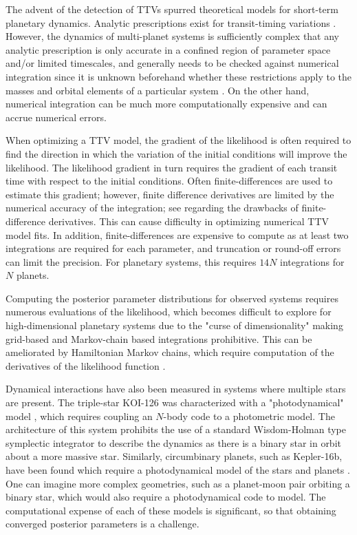 \documentclass[fleqn,usenatbib,twocolumn]{mnras}
\newcommand   {\change}[1] {{\color{black}{#1}}}
\begin{document}
The advent of the detection of TTVs spurred theoretical models for
short-term planetary dynamics. Analytic prescriptions exist for transit-timing
variations \citep[e.g.][]{Agol2005,Nesvorn2010,Lithwick2012,Nesvorn2014,
Deck2015,Agol2016,Deck2016,Nesvorn2016,Hadden2016}.
However, the dynamics of multi-planet
systems is sufficiently complex that any analytic prescription is only
accurate in a confined region of parameter space and/or limited timescales, and generally needs
to be checked against numerical integration since it is unknown beforehand
whether these restrictions apply to the masses and orbital
elements of a particular system \citep[e.g.][]{Deck2015,JontofHutter2016,
Hadden2017,Linial2018,Yoffe2021}.  On the other hand, numerical integration
can be much more computationally expensive and can accrue numerical errors.

When optimizing a TTV model, the gradient of the likelihood is often
required to find the direction in which the variation of the initial conditions
will improve the likelihood.  The likelihood gradient in turn
requires the gradient of each transit time with respect to the initial
conditions.  Often finite-differences are used to estimate this gradient;
however, finite difference derivatives are limited by the numerical
accuracy of the integration; see \citet{Rein2016} regarding the drawbacks of finite-difference derivatives.  This can cause
difficulty in optimizing numerical TTV model fits.   In addition, finite-differences are expensive to compute as at least
two integrations are required for each parameter, and truncation or round-off errors can limit the precision.  For planetary systems, this requires $14N$ integrations for $N$ planets.

Computing the posterior
parameter distributions for observed systems requires numerous evaluations
of the likelihood, which becomes difficult to explore for high-dimensional
planetary systems due to the "curse of dimensionality" making grid-based
and Markov-chain based integrations prohibitive.  This can be ameliorated
by Hamiltonian Markov chains, which require computation of the derivatives
of the likelihood function \citep{Girolami2011}.

Dynamical interactions have also been measured in systems where
multiple stars are present.  The triple-star KOI-126 was characterized
with a "photodynamical" model \citep{Carter2011}, which requires coupling
an $N$-body code to a photometric model.  The architecture of this system
prohibits the use of a standard Wisdom-Holman type symplectic integrator to describe the
dynamics as there is a binary star in orbit about a more massive star.
Similarly, circumbinary planets, such as Kepler-16b, have been
found which require a photodynamical model of the stars and planets
\citep{Doyle2011}.  One can imagine more complex geometries, such as
a planet-moon pair orbiting a binary star, which would also require
a photodynamical code to model.  The computational expense of each of these models is significant, so that obtaining converged posterior parameters is a challenge. \change{An advantage of photodynamical models is that the covariance between transit parameters and orbital parameters may be computed directly from the light curve.}
\end{document}
